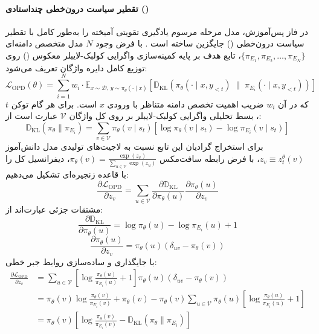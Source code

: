 \paragraph*{تقطیر سیاست درون‌خطی چنداستادی ()}
در فاز پس‌آموزش، مدل  مرحله مرسوم یادگیری تقویتی آمیخته را به‌طور کامل با تقطیر سیاست درون‌خطی () جایگزین ساخته است \cite{lu2025onpolicy}. با فرض وجود $N$ مدل متخصص دامنه‌ای $\{ \pi_{E_1}, \pi_{E_2}, \dots, \pi_{E_N} \}$، تابع هدف  بر پایه کمینه‌سازی واگرایی کولبک-لایبلر معکوس () روی توزیع کامل دایره واژگان تعریف می‌شود:
\begin{equation}
    \mathcal{L}_{\text{OPD}}(\theta) = \sum_{i=1}^N w_i \cdot \mathbb{E}_{x \sim \mathcal{D}, \, y \sim \pi_\theta(\cdot \mid x)} \left[ \mathbb{D}_{\text{KL}}\left(\pi_\theta(\cdot \mid x, y_{<t}) \;\parallel\; \pi_{E_i}(\cdot \mid x, y_{<t})\right) \right]
\end{equation}
که در آن $w_i$ ضریب اهمیت تخصص دامنه متناظر با ورودی $x$ است. برای هر گام توکن $t$، بسط تحلیلی واگرایی کولبک-لایبلر بر روی کل واژگان $\mathcal{V}$ عبارت است از:
\begin{equation}
    \mathbb{D}_{\text{KL}}(\pi_\theta \parallel \pi_{E_i}) = \sum_{v \in \mathcal{V}} \pi_\theta(v \mid s_t) \left[ \log \pi_\theta(v \mid s_t) - \log \pi_{E_i}(v \mid s_t) \right]
\end{equation}
برای استخراج گرادیان این تابع نسبت به لاجیت‌های تولیدی مدل دانش‌آموز $z_v \equiv z_t^\theta(v)$، با فرض رابطه سافت‌مکس $\pi_\theta(v) = \frac{\exp(z_v)}{\sum_{u \in \mathcal{V}} \exp(z_u)}$، دیفرانسیل کل را با قاعده زنجیره‌ای تشکیل می‌دهیم:
\begin{equation}
    \frac{\partial \mathcal{L}_{\text{OPD}}}{\partial z_v} = \sum_{u \in \mathcal{V}} \frac{\partial \mathbb{D}_{\text{KL}}}{\partial \pi_\theta(u)} \frac{\partial \pi_\theta(u)}{\partial z_v}
\end{equation}
مشتقات جزئی عبارت‌اند از:
\begin{equation}
    \frac{\partial \mathbb{D}_{\text{KL}}}{\partial \pi_\theta(u)} = \log \pi_\theta(u) - \log \pi_{E_i}(u) + 1
\end{equation}
\begin{equation}
    \frac{\partial \pi_\theta(u)}{\partial z_v} = \pi_\theta(u) \left(\delta_{uv} - \pi_\theta(v)\right)
\end{equation}
با جایگذاری و ساده‌سازی روابط جبر خطی:
\begin{align}
    \frac{\partial \mathcal{L}_{\text{OPD}}}{\partial z_v} &= \sum_{u \in \mathcal{V}} \left[ \log \frac{\pi_\theta(u)}{\pi_{E_i}(u)} + 1 \right] \pi_\theta(u) (\delta_{uv} - \pi_\theta(v)) \nonumber \\
    &= \pi_\theta(v) \log \frac{\pi_\theta(v)}{\pi_{E_i}(v)} + \pi_\theta(v) - \pi_\theta(v) \sum_{u \in \mathcal{V}} \pi_\theta(u) \left[ \log \frac{\pi_\theta(u)}{\pi_{E_i}(u)} + 1 \right] \nonumber \\
    &= \pi_\theta(v) \left[ \log \frac{\pi_\theta(v)}{\pi_{E_i}(v)} - \mathbb{D}_{\text{KL}}(\pi_\theta \parallel \pi_{E_i}) \right]
\end{align}
